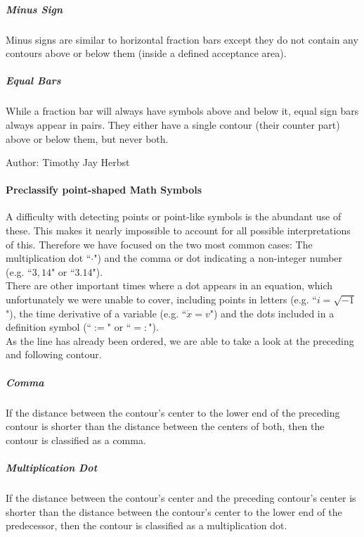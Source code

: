 \documentclass[11pt]{article}
\begin{document}
	\subparagraph{Minus Sign}
	Minus signs are similar to horizontal fraction bars except they do not contain any contours above or below them (inside a defined acceptance area).

	\subparagraph{Equal Bars}\label{equalbars}
	While a fraction bar will always have symbols above and below it, equal sign bars always appear in pairs. They either have a single contour (their counter part) above or below them, but never both.
	
	\small{Author: Timothy Jay Herbst} \newline \newline
	\paragraph{Preclassify point-shaped Math Symbols}
	A difficulty with detecting points or point-like symbols is the abundant use of these.
	This makes it nearly impossible to account for all possible interpretations of this.
	Therefore we have focused on the two most common cases:
	The multiplication dot ``$\cdot$") and the comma or dot indicating a non-integer number (e.g. ``$3,14$" or ``$3.14$").\\
	There are other important times where a dot appears in an equation, which unfortunately we were unable to cover, including points in letters (e.g. ``$i=\sqrt{-1}$"), the time derivative of a variable (e.g. ``$\dot{x}=v$") and the dots included in a definition symbol (``$:=$" or ``$=:$").\\  %
	As the line has already been ordered, we are able to take a look at the preceding and following contour.
	
	\subparagraph{Comma}
	If the distance between the contour's center to the lower end of the preceding contour is shorter than the distance between the centers of both, then the contour is classified as a comma.\\
	
	\subparagraph{Multiplication Dot}
	If the distance between the contour's center and the preceding contour's center is shorter than the distance between the contour's center to the lower end of the predecessor, then the contour is classified as a multiplication dot.\\
\end{document}
